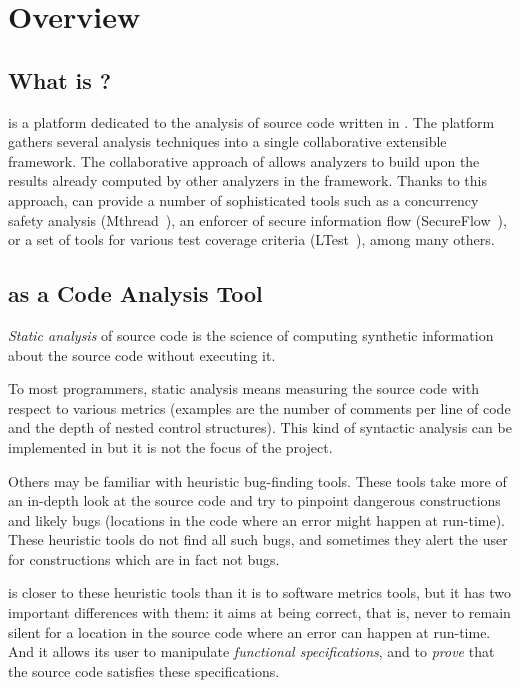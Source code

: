 \chapter{Overview}
\label{user-overview}

\section{What is \FramaC?}

\FramaC is a platform dedicated to the analysis of source code written in
. The \FramaC platform gathers several analysis techniques into
a single collaborative extensible framework. The collaborative approach of
\FramaC allows analyzers to build upon the results already computed by
other analyzers in the framework. Thanks to this approach, \FramaC can provide
a number of sophisticated tools such as a concurrency safety analysis
(Mthread~\cite{mthread}),
an enforcer of secure information flow (SecureFlow~\cite{secureflow1,secureflow2}),
or a set of tools for various test coverage criteria (LTest~\cite{ltest}), among many others.

\section{\FramaC as a Code Analysis Tool}

\emph{Static analysis} of source code is the science of computing synthetic
information about the source code without executing it.

To most programmers, static analysis means measuring the source code with
respect to various metrics (examples are the number of comments per line of
code and the depth of nested control structures). This kind of syntactic
analysis can be implemented in \FramaC but it is not the focus of the project.

Others may be familiar with heuristic bug-finding tools. These tools take more
of an in-depth look at the source code and try to pinpoint dangerous
constructions and likely bugs (locations in the code where an error might
happen at run-time). These heuristic tools do not find all such bugs, and
sometimes they alert the user for constructions which are in fact not bugs.

\FramaC is closer to these heuristic tools than it is to software metrics
tools, but it has two important differences with them: it aims at being
correct, that is, never to remain silent for a location in the source code
where an error can happen at run-time. And it allows its user to manipulate
\emph{functional specifications}, and to \emph{prove} that the source code
satisfies these specifications.

